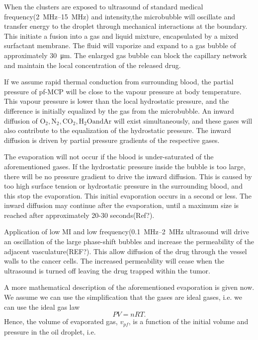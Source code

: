 When the clusters are exposed to ultrasound of standard medical frequency(\SIrange{2}{15}{\mega\hertz}\cite{Hoskins2010}) and intensity,the microbubble will oscillate and transfer energy to the droplet through mechanical interactions at the boundary. This initiate a fusion into a gas and liquid mixture, encapsulated by a mixed surfactant membrane. The fluid will vaporize and expand to a gas bubble of approximately \SI{30}{\micro\metre}. The enlarged gas bubble can block the capillary network and maintain the local concentration of the released drug. 

If we assume rapid thermal conduction from surrounding blood, the partial pressure of pf-MCP will be close to the vapour pressure at body temperature. This vapour pressure is lower than the local hydrostatic pressure, and the difference is initially equalized by the gas from the microbubble. An inward diffusion of $\mathrm{O_2, N_2, CO_2, H_2O and Ar}$ will exist simultaneously, and these gases will also contribute to the equalization of the hydrostatic pressure. The inward diffusion is driven by partial pressure gradients of the respective gases. 

The evaporation will not occur if the blood is under-saturated of the aforementioned gases. If the hydrostatic pressure inside the bubble is too large, there will be no pressure gradient to drive the inward diffusion. This is caused by too high surface tension or hydrostatic pressure in the surrounding blood, and this stop the evaporation. This initial evaporation occurs in a second or less\cite{Healey2013}. The inward diffusion may continue after the evaporation, until a maximum size is reached after approximately 20-30 seconds(Ref?).

Application of low MI and low frequency(\SIrange{0.1}{2}{\mega\hertz} ultrasound will drive an oscillation of the large phase-shift bubbles and increase the permeability of the adjacent vasculature(REF?). This allow diffusion of the drug through the vessel walls to the cancer cells. The increased permeability will cease when the ultrasound is turned off leaving the drug trapped within the tumor.

A more mathematical description of the aforementioned evaporation is given now\cite{Healey2013}. We assume we can use the simplification that the gases are ideal gases, i.e. we can use the ideal gas law
\begin{equation}
\label{ideal gas law}
 PV = nRT. 
\end{equation}  
Hence, the volume of evaporated gas, $v_{pf}$, is a function of the initial volume and pressure in the oil droplet, i.e.


